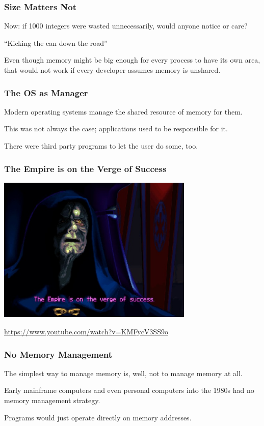 \begin{frame}
\frametitle{Size Matters Not}

Now: if 1000 integers were wasted unnecessarily, would anyone notice or care?

``Kicking the can down the road''

Even though memory might be big enough for every process to have its own area, that would not work if every developer assumes memory is unshared. 


\end{frame}

\begin{frame}
\frametitle{The OS as Manager}

Modern operating systems manage the shared resource of memory for them. 

This was not always the case; applications used to be responsible for it.

There were third party programs to let the user do some, too. 


\end{frame}


\begin{frame}
\frametitle{The Empire is on the Verge of Success}

\begin{center}
	\includegraphics[width=0.7\textwidth]{images/empire-success.jpg}
\end{center}


\url{https://www.youtube.com/watch?v=KMFycV3SS9o}


\end{frame}

\begin{frame}
\frametitle{No Memory Management}

The simplest way to manage memory is, well, not to manage memory at all.

Early mainframe computers and even personal computers into the 1980s had no memory management strategy. 

Programs would just operate directly on memory addresses. 

\end{frame}

